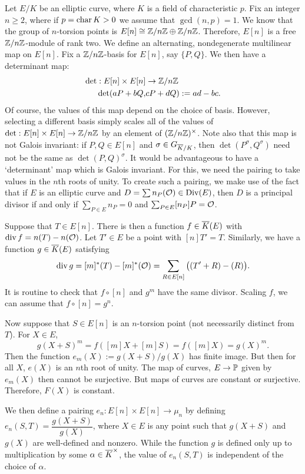 Let $E/K$ be an elliptic curve, where $K$ is a field of characteristic $p$. Fix an integer $n \geq 2$, where if $p= \operatorname{char} K > 0$  we assume that $\gcd(n,p)= 1$. We know that the group of $n$-torsion points is $E[n] \cong \mathbb{Z}/n\mathbb{Z} \oplus \mathbb{Z}/n\mathbb{Z}$. Therefore, $E[n]$ is a free $\mathbb{Z}/n\mathbb{Z}$-module of rank two. We define an alternating, nondegenerate multilinear map on $E[n]$. Fix a $\mathbb{Z}/n\mathbb{Z}$-basis for $E[n]$, say $\{ P, Q \}$. We then have a determinant map:
	\[
	\begin{aligned}
	\det: E[n] \times E[n] &\to \mathbb{Z}/n\mathbb{Z} \\
	\det(aP + bQ,& cP + dQ):= ad - bc.
	\end{aligned}
	\]
Of course, the values of this map depend on the choice of basis. However, selecting a different basis simply scales all of the values of $\det: E[n] \times E[n] \to \mathbb{Z}/n\mathbb{Z}$ by an element of $(\mathbb{Z}/n\mathbb{Z})^\times$. Note also that this map is not Galois invariant: if $P, Q \in E[n]$ and $\sigma \in G_{\overline{K}/K}$, then $\det(P^\sigma, Q^\sigma)$ need not be the same as $\det(P,Q)^\sigma$. It would be advantageous to have a `determinant' map which is Galois invariant. For this, we need the pairing to take values in the $n$th roots of unity. To create such a pairing, we make use of the fact that if $E$ is an elliptic curve and $D= \sum n_P(\mathcal{O}) \in \operatorname{Div}(E)$, then $D$ is a principal divisor if and only if $\sum_{P \in E} n_P= 0$ and $\sum_{P \in E} [n_P]P= \mathcal{O}$. 


Suppose that $T \in E[n]$. There is then a function $f \in \overline{K}(E)$ with $\operatorname{div} f= n(T) - n(\mathcal{O})$. Let $T' \in E$ be a point with $[n]T'= T$. Similarly, we have a function $g \in \overline{K}(E)$ satisfying
	\[
	\operatorname{div} g = [m]^*(T) - [m]^*(\mathcal{O}) = \sum_{R \in E[n]} \big( (T' + R) - (R) \big).
	\]
It is routine to check that $f \circ [n]$ and $g^m$ have the same divisor. Scaling $f$, we can assume that $f \circ [n]= g^n$. 


Now suppose that $S \in E[n]$ is an $n$-torsion point (not necessarily distinct from $T$). For $X \in E$, 
	\[
	g(X + S)^m= f([m]X + [m] S)= f([m]X)= g(X)^m.
	\]
Then the function $e_m(X):= g(X + S)/g(X)$ has finite image. But then for all $X$, $e(X)$ is an $n$th root of unity. The map of curves, $E \to \mathbb{P}$ given by $e_m(X)$ then cannot be surjective. But maps of curves are constant or surjective. Therefore, $F(X)$ is constant. 


We then define a pairing $e_n \colon E[n] \times E[n] \to \mu_n$ by defining $e_n(S,T)= \dfrac{g(X + S)}{g(X)}$, where $X \in E$ is any point such that $g(X + S)$ and $g(X)$ are well-defined and nonzero. While the function $g$ is defined only up to multiplication by some $\alpha \in \overline{K}^\times$, the value of $e_n(S,T)$ is independent of the choice of $\alpha$. 


